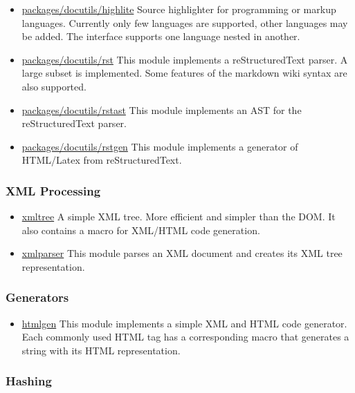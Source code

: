 \begin{itemize}
\tightlist
\item
  \href{highlite.html}{packages/docutils/highlite} Source highlighter
  for programming or markup languages. Currently only few languages are
  supported, other languages may be added. The interface supports one
  language nested in another.
\item
  \href{rst.html}{packages/docutils/rst} This module implements a
  reStructuredText parser. A large subset is implemented. Some features
  of the markdown wiki syntax are also supported.
\item
  \href{rstast.html}{packages/docutils/rstast} This module implements an
  AST for the reStructuredText parser.
\item
  \href{rstgen.html}{packages/docutils/rstgen} This module implements a
  generator of HTML/Latex from reStructuredText.
\end{itemize}

\hypertarget{xml-processing}{%
\subsubsection{XML Processing}\label{xml-processing}}

\begin{itemize}
\tightlist
\item
  \href{xmltree.html}{xmltree} A simple XML tree. More efficient and
  simpler than the DOM. It also contains a macro for XML/HTML code
  generation.
\item
  \href{xmlparser.html}{xmlparser} This module parses an XML document
  and creates its XML tree representation.
\end{itemize}

\hypertarget{generators}{%
\subsubsection{Generators}\label{generators}}

\begin{itemize}
\tightlist
\item
  \href{htmlgen.html}{htmlgen} This module implements a simple XML and
  HTML code generator. Each commonly used HTML tag has a corresponding
  macro that generates a string with its HTML representation.
\end{itemize}

\hypertarget{hashing}{%
\subsubsection{Hashing}\label{hashing}}


